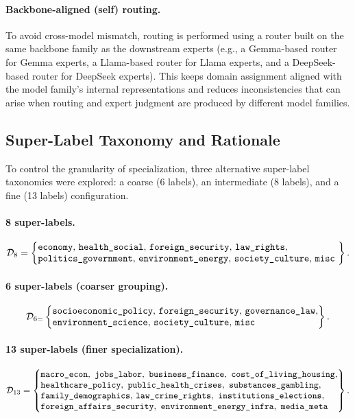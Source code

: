 \paragraph{Backbone-aligned (self) routing.}
To avoid cross-model mismatch, routing is performed using a router built on the same backbone family as the downstream experts (e.g., a Gemma-based router for Gemma experts, a Llama-based router for Llama experts, and a DeepSeek-based router for DeepSeek experts). This keeps domain assignment aligned with the model family's internal representations and reduces inconsistencies that can arise when routing and expert judgment are produced by different model families.

\subsection{Super-Label Taxonomy and Rationale}

To control the granularity of specialization, three alternative super-label taxonomies were explored: a coarse (6 labels), an intermediate (8 labels), and a fine (13 labels) configuration.

\paragraph{8 super-labels.}
\[
\mathcal{D}_{8}=\left\{
\begin{array}{@{}l@{}}
\texttt{economy},\,\texttt{health\_social},\,\texttt{foreign\_security},\,\texttt{law\_rights},\\
\texttt{politics\_government},\,\texttt{environment\_energy},\,\texttt{society\_culture},\,\texttt{misc}\
\end{array}
\right\}.
\]

\paragraph{6 super-labels (coarser grouping).}
\[
\mathcal{D}_{6=}\left\{
\begin{array}{@{}l@{}}
\texttt{socioeconomic\_policy},\,\texttt{foreign\_security},\,\texttt{governance\_law},\\
\texttt{environment\_science},\,\texttt{society\_culture},\,\texttt{misc}
\end{array}
\right\}.
\]

\paragraph{13 super-labels (finer specialization).}
\[
\mathcal{D}_{13}=\left\{
\begin{array}{@{}l@{}}
\texttt{macro\_econ},\ \texttt{jobs\_labor},\ \texttt{business\_finance},\ \texttt{cost\_of\_living\_housing},\\
\texttt{healthcare\_policy},\ \texttt{public\_health\_crises},\ \texttt{substances\_gambling},\\
\texttt{family\_demographics},\,\texttt{law\_crime\_rights},\
\texttt{institutions\_elections},\\ \texttt{foreign\_affairs\_security},\
\texttt{environment\_energy\_infra},\ \texttt{media\_meta}
\end{array}
\right\}.
\]

